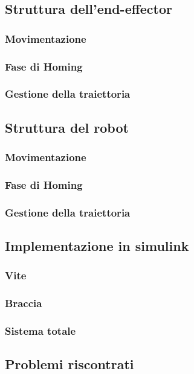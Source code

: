 \subsection{Struttura dell'end-effector}
\subsubsection{Movimentazione}
\subsubsection{Fase di Homing}
\subsubsection{Gestione della traiettoria}
\subsection{Struttura del robot}
\subsubsection{Movimentazione}
\subsubsection{Fase di Homing}
\subsubsection{Gestione della traiettoria}
\subsection{Implementazione in simulink}
\subsubsection{Vite}
\subsubsection{Braccia}
\subsubsection{Sistema totale}
\subsection{Problemi riscontrati}